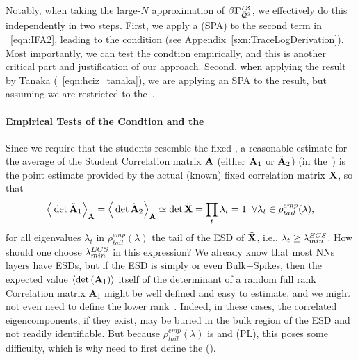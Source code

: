 Notably, when taking the large-$N$ approximation of $\beta\mathbf{\Gamma}^{IZ}_{\bar{\mathcal{Q}}^{2}}$, we effectively  do this independently in two steps.
First, we apply a \SaddlePointApproximation (SPA) to the second term in \EQN~\ref{eqn:IFA2},
leading to the \TRACELOG condition (see Appendix~\ref{sxn:TraceLogDerivation}).
Most importantly, we can test the \TRACELOG condtion empirically,
and this is another  critical part and justification of our \SETOL approach.
Second, when applying the result by Tanaka (\EQN~\ref{eqn:hciz_tanaka}),
we are applying an SPA to the result, but assuming we are
restricted to the~\ECS.

\paragraph{Empirical Tests of the \TRACELOG Condtion and the~\ECS}

Since we require that the students resemble the fixed \Teacher, a reasonable estimate for the average of the Student
Correlation matrix $\tilde{\mathbf{A}}$
(either $\tilde{\mathbf{A}}_{1}$ or $\tilde{\mathbf{A}}_{2}$)  (in the~\ECS)  is the point estimate provided by the actual (known) fixed \Teacher correlation matrix $\tilde{\mathbf{X}}$, so that
\begin{align}
\label{eqn:IFA-ppint}
\Big\langle \det\tilde{\mathbf{A}}_{1}\Big\rangle_{\tilde{\mathbf{A}}}=
\Big\langle \det\tilde{\mathbf{A}}_{2}\Big\rangle_{\tilde{\mathbf{A}}}
\simeq\det\tilde{\mathbf{X}}=\prod_{t}\lambda_{t}=1\;\;\forall\lambda_{t}\in\rho^{emp}_{tail}(\lambda) ,
\end{align}
for all eigenvalues $\lambda_{t}$ in $\rho^{emp}_{tail}(\lambda)$ the tail of the
ESD of $\tilde{\mathbf{X}}$, i.e., $\lambda_{t}\ge\lambda^{ECS}_{min}$.
%
How should one choose $\lambda^{ECS}_{min}$ in this expression?
We already know that most NNs layers have \FatTailed ESDs, but
if the \Teacher ESD is simply \emph{\RandomLike} or even Bulk+Spikes, then the expected value
$\langle\mbox{}{\text{det}}\left(\mathbf{A}_{1}\right)\rangle$ itself of the determinant
of a random full rank \Student Correlation matrix $\mathbf{A}_{1}$
might be well defined and easy to estimate, and we might not even need to define the lower rank~\ECS.
Indeed, in these cases, the correlated eigencomponents, if they exist, may be buried in the bulk
region of the ESD and not readily identifiable.
But because $\rho_{tail}^{emp}(\lambda)$ is \FatTailed
and \PowerLaw (PL), this poses some difficulty,
which is why need to first define the \EffectiveCorrelationSpace (\ECS).


